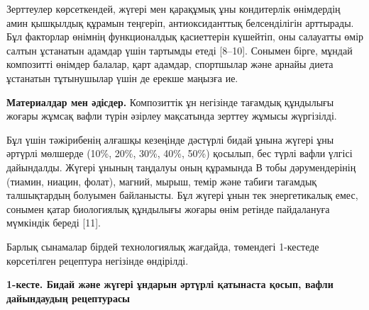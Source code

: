 Зерттеулер көрсеткендей, жүгері мен қарақұмық ұны кондитерлік өнімдердің
амин қышқылдық құрамын теңгеріп, антиоксиданттық белсенділігін
арттырады. Бұл факторлар өнімнің функционалдық қасиеттерін күшейтіп, оны
салауатты өмір салтын ұстанатын адамдар үшін тартымды етеді {[}8--10{]}.
Сонымен бірге, мұндай композитті өнімдер балалар, қарт адамдар,
спортшылар және арнайы диета ұстанатын тұтынушылар үшін де ерекше
маңызға ие.

{\bfseries Материалдар мен әдісдер.} Композиттік ұн негізінде тағамдық
құндылығы жоғары жұмсақ вафли түрін әзірлеу мақсатында зерттеу жұмысы
жүргізілді.

Бұл үшін тәжірибенің алғашқы кезеңінде дәстүрлі бидай ұнына жүгері ұны
әртүрлі мөлшерде (10\%, 20\%, 30\%, 40\%, 50\%) қосылып, бес түрлі вафли
үлгісі дайындалды. Жүгері ұнының таңдалуы оның құрамында В тобы
дәрумендерінің (тиамин, ниацин, фолат), магний, мырыш, темір және табиғи
тағамдық талшықтардың болуымен байланысты. Бұл жүгері ұнын тек
энергетикалық емес, сонымен қатар биологиялық құндылығы жоғары өнім
ретінде пайдалануға мүмкіндік береді {[}11{]}.

Барлық сынамалар бірдей технологиялық жағдайда, төмендегі 1-кестеде
көрсетілген рецептура негізінде өндірілді.

{\bfseries 1-кесте. Бидай және жүгері ұндарын әртүрлі қатынаста қосып,
вафли дайындаудың рецептурасы}

